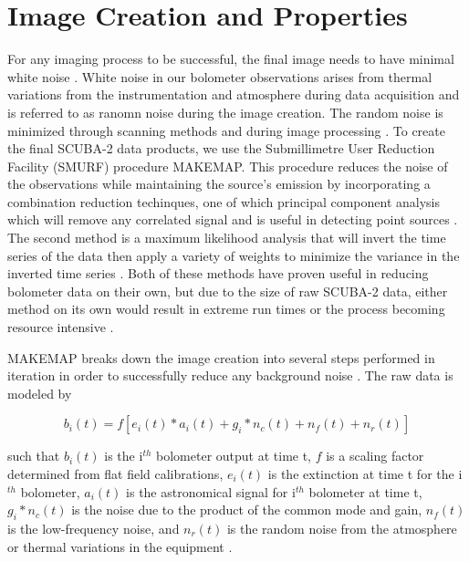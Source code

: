 \section{Image Creation and Properties}\label{sc2_imgs}

For any imaging process to be successful, the final image needs to have minimal white noise \citep{chapin2013}.  White noise in our bolometer observations arises from thermal variations from the instrumentation and atmosphere during data acquisition and is referred to as ranomn noise during the image creation. The random noise is minimized through scanning methods and during image processing \citep{chapin2013}.  To create the final SCUBA-2 data products, we use the Submillimetre User Reduction Facility (SMURF) procedure MAKEMAP.  This procedure reduces the noise of the observations while maintaining the source's emission by incorporating a combination reduction techinques, one of which principal component analysis which will remove any correlated signal and is useful in detecting point sources \citep{chapin2013}.  The second method is a maximum likelihood analysis that will invert the time series of the data then apply a variety of weights to minimize the variance in the inverted time series \citep{janssen1992,chapin2013}.  Both of these methods have proven useful in reducing bolometer data on their own, but due to the size of raw SCUBA-2 data, either method on its own would result in extreme run times or the process becoming resource intensive \citep{chapin2013}.


MAKEMAP breaks down the image creation into several steps performed in iteration in order to successfully reduce any background noise \citep{chapin2013}.  The raw data is modeled by 

\begin{equation}\label{eq:sc2_raw}
  b_i(t) = f \left[ e_i(t)*a_i(t) + g_i*n_c(t)+n_f(t)+n_r(t)\right]
\end{equation}

\noindent such that $b_i(t)$ is the i$^{th}$ bolometer output at time t, $f$ is a scaling factor determined from flat field calibrations, $e_i(t)$ is the extinction at time t for the i$^{th}$ bolometer, $a_i(t)$ is the astronomical signal for i$^{th}$ bolometer at time t,  $g_i*n_c(t)$ is the noise due to the product of the common mode and gain,  $n_f(t)$ is the low-frequency noise, and  $n_r(t)$ is the random noise from the atmosphere or thermal variations in the equipment \citep{chapin2013}.

